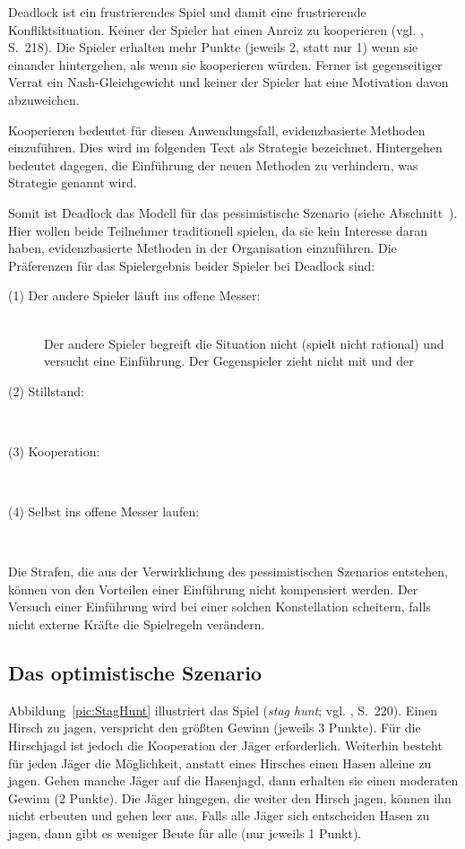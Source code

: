 Deadlock ist ein frustrierendes Spiel und damit eine frustrierende Konfliktsituation. Keiner der Spieler hat einen Anreiz
zu kooperieren (vgl. \cite{Poundstone}, S.~218). Die Spieler erhalten mehr Punkte (jeweils 2, statt nur 1) wenn sie einander hintergehen,
als wenn sie kooperieren würden. Ferner ist gegenseitiger Verrat ein Nash-Gleichgewicht und keiner der Spieler hat eine Motivation davon
abzuweichen.

Kooperieren bedeutet für diesen Anwendungsfall, evidenzbasierte Methoden einzuführen. Dies wird im
folgenden Text als \grqq{} Strategie bezeichnet. Hintergehen bedeutet dagegen, die
Einführung der neuen Methoden zu verhindern, was \grqq{} Strategie genannt wird.
 
Somit ist Deadlock das Modell für das pessimistische Szenario (siehe Abschnitt~\xcom). 
Hier wollen beide Teilnehmer traditionell spielen, da sie kein Interesse daran haben, evidenzbasierte Methoden
in der Organisation einzuführen. Die Präferenzen für das Spielergebnis beider Spieler bei Deadlock sind:
\begin{description}

\item[(1) Der andere Spieler läuft ins offene Messer:] \hfill \\
Der andere Spieler begreift die Situation nicht (spielt nicht rational) und versucht eine Einführung.
Der Gegenspieler zieht nicht mit und der 
\item[(2) Stillstand:] \hfill \\

\item[(3) Kooperation:] \hfill \\

\item[(4) Selbst ins offene Messer laufen:] \hfill \\

\end{description}
Die Strafen, die aus der Verwirklichung des
pessimistischen Szenarios entstehen, können von den Vorteilen einer Einführung nicht kompensiert werden.
Der Versuch einer Einführung wird bei einer solchen Konstellation scheitern, falls nicht externe Kräfte die
Spielregeln verändern.

\subsection{Das optimistische Szenario}

Abbildung~\ref{pic:StagHunt} illustriert das Spiel \grqq{} (\emph{stag hunt}; vgl. \cite{Poundstone}, S.~220).
Einen Hirsch zu jagen, verspricht den größten Gewinn (jeweils 3 Punkte). Für die Hirschjagd ist jedoch die Kooperation der Jäger
erforderlich. Weiterhin besteht für jeden Jäger die Möglichkeit, anstatt eines Hirsches einen Hasen alleine zu jagen. Gehen manche
Jäger auf die Hasenjagd, dann erhalten sie einen moderaten Gewinn (2 Punkte). Die Jäger hingegen, die weiter den Hirsch jagen, können
ihn nicht erbeuten und gehen leer aus. Falls alle Jäger sich entscheiden Hasen zu jagen, dann gibt es weniger Beute für alle (nur jeweils
1 Punkt).

